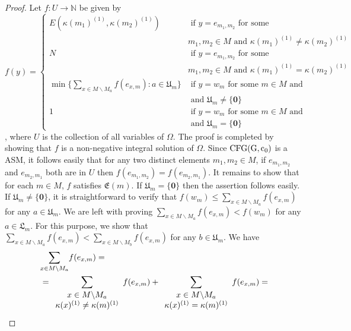 \documentclass{article}
\theoremstyle{definition}
\newcommand\downn[2]{e_{#1,#2}}
\newcommand\downnn[2]{{#1}_{#2}}
\newcommand\set[1]{\{ #1 \}}
\begin{document}
\begin{proof}
Let $f:U\to \mathbb{N}$ be given by
$$
f(y)=\begin{cases}
E(\kappa(m_1)^{(1)},\kappa(m_2)^{(1)})&\text{ if } y=\downn{m_1}{m_2}\text{ for some }\\ 
&m_1,m_2\in M\text{ and }\kappa(m_1)^{(1)}\neq \kappa(m_2)^{(1)}\\
N&\text{ if }y=\downn{m_1}{m_2}\text{ for some}\\
&m_1,m_2\in M \text{ and } \kappa(m_1)^{(1)}=\kappa(m_2)^{(1)}\\
\min\set{ \underset{x \in M\backslash M_a}{\sum}f(\downn{x}{m}): a \in \mathfrak{U}_m }& \text{ if } y=\downnn{w}{m} \text{ for some } m \in M\text{ and }\\
&\text{ and }\mathfrak{U}_m \neq \set{\textbf{0}}\\
1&\text{ if } y=\downnn{w}{m} \text{ for some } m \in M\text{ and }\\
&\text{ and } \mathfrak{U}_m=\set{\textbf{0}}
\end{cases}
$$, where $U$ is the collection of all variables of $\Omega$. The proof is completed by showing that $f$ is a non-negative integral solution of $\Omega$. Since ${\rm CFG(G,c_0)}$ is a ASM, it follows easily that for any two distinct elements $m_1,m_2\in M$, if $\downn{m_1}{m_2}$ and $\downn{m_2}{m_1}$ both are in $U$ then $f(\downn{m_1}{m_2})=f(\downn{m_2}{m_1})$.  It remains to show that for each $m \in M$, $f$ satisfies $\mathfrak{E}(m)$. If $\mathfrak{U}_m=\set{\textbf{0}}$ then the assertion follows easily. If $\mathfrak{U}_m\neq \set{\textbf{0}}$, it is straightforward to verify that $f(\downnn{w}{m})\leq \underset{x\in M\backslash M_a}{\sum} f(\downn{x}{m})$ for any $a \in \mathfrak{U}_m$. We are left with proving $\underset{x \in M\backslash M_a}{\sum}f(\downn{x}{m})<f(\downnn{w}{m})$ for any $a\in \mathfrak{L}_m$. For this purpose, we show that $\underset{x \in M\backslash M_a}{\sum}f(\downn{x}{m})<\underset{x \in M\backslash M_b}{\sum}f(\downn{x}{m})$ for any $b\in \mathfrak{U}_m$. We have
\begin{align}
\notag &\underset{x\in M\backslash  M_a}{\sum}f(\downn{x}{m})=\\
\notag &=\underset{\begin{array}{c} x \in M\backslash  M_a \\  \kappa(x)^{(1)}\neq \kappa(m)^{(1)} \end{array}}{\sum}f(\downn{x}{m})+\underset{\begin{array}{c} x \in M\backslash M_a \\ \kappa(x)^{(1)}=\kappa(m)^{(1)}  \end{array}}{\sum}f(\downn{x}{m})=\\

\end{align}
\end{proof}
\end{document}
